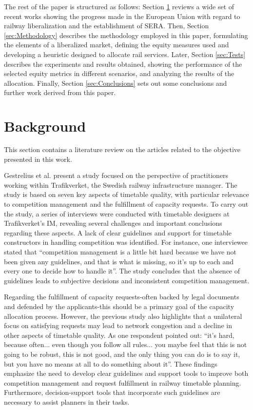\documentclass[preprint,12pt]{elsarticle}
\begin{document}
The rest of the paper is structured as follows: Section \ref{sec:background} reviews a wide set of recent works showing the progress made in the European Union with regard to railway liberalization and the establishment of \gls{SERA}. Then, Section \ref{sec:Methodology} describes the methodology employed in this paper, formulating the elements of a liberalized market, defining the equity measures used and developing a heuristic designed to allocate rail services. Later, Section \ref{sec:Tests} describes the experiments and results obtained, showing the performance of the selected equity metrics in different scenarios, and analyzing the results of the allocation. Finally, Section \ref{sec:Conclusions} sets out some conclusions and further work derived from this paper.

\section{Background}\label{sec:background}

This section contains a literature review on the articles related to the objective presented in this work.

Gestrelius et al. \cite{Gestrelius2020} present a study focused on the perspective of practitioners working within Trafikverket, the Swedish railway infrastructure manager.  The study is based on seven key aspects of timetable quality, with particular relevance to competition management and the fulfillment of capacity requests. To carry out the study, a series of interviews were conducted with timetable designers at Trafikverket’s \gls{IM}, revealing several challenges and important conclusions regarding these aspects. A lack of clear guidelines and support for timetable constructors in handling competition was identified. For instance, one interviewee stated that ``competition management is a little bit hard because we have not been given any guidelines, and that is what is missing, so it’s up to each and every one to decide how to handle it''. The study concludes that the absence of guidelines leads to subjective decisions and inconsistent competition management. 

Regarding the fulfillment of capacity requests-often backed by legal documents and defended by the applicants-this should be a primary goal of the capacity allocation process. However, the previous study also highlights that a unilateral focus on satisfying requests may lead to network congestion and a decline in other aspects of timetable quality. As one respondent pointed out: ``it’s hard, because often... even though you follow all rules... you maybe feel that this is not going to be robust, this is not good, and the only thing you can do is to say it, but you have no means at all to do something about it''. These findings emphasize the need to develop clear guidelines and support tools to improve both competition management and request fulfillment in railway timetable planning. Furthermore, decision-support tools that incorporate such guidelines are necessary to assist planners in their tasks.
\end{document}
